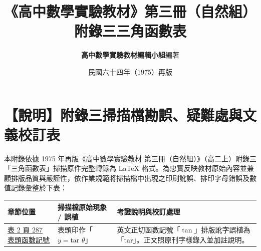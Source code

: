 \documentclass[a4paper,12pt,twoside]{article}
\title{\LARGE\textbf{《高中數學實驗教材》第三冊（自然組）}\\[0.5em] \Large\textbf{附錄三\quad 三角函數表}}
\author{\textbf{高中數學實驗教材編輯小組}\quad 編著}
\date{民國六十四年（1975）再版}
\begin{document}
\maketitle
\thispagestyle{firstpage}

\section*{【說明】附錄三掃描檔勘誤、疑難處與文義校訂表}
\label{sec:errata_notes_b3_a3}

本附錄依據 1975 年再版《高中數學實驗教材 第三冊（自然組）》（高二上）附錄三「三角函數表」掃描原件完整轉錄為 \LaTeX{} 格式。為忠實反映教材原始內容並兼顧排版品質與嚴謹性，依作業規範將掃描檔中出現之印刷訛誤、排印字母錯誤及數值記錄彙整於下表：

\begin{table}[H]
\centering
\small
\renewcommand{\arraystretch}{1.35}
\begin{tabularx}{\textwidth}{|p{3.2cm}|p{3.8cm}|X|}
\hline
\textbf{章節位置} & \textbf{掃描檔原始現象 / 誤植} & \textbf{考證說明與校訂處理} \\ \hline

\hyperref[note:b3-a3-p287-tar]{表 2 頁 287 表頭函數記號} & 
表頭印作「$y = \text{tar }\theta$」 & 
英文正切函數記號「$\tan$」排版訛字誤植為「$\text{tar}$」。正文照原刊字樣錄入並加註說明。 \\ \hline

\end{tabularx}
\end{table}

\clearpage
\tableofcontents
\newpage


\end{document}
